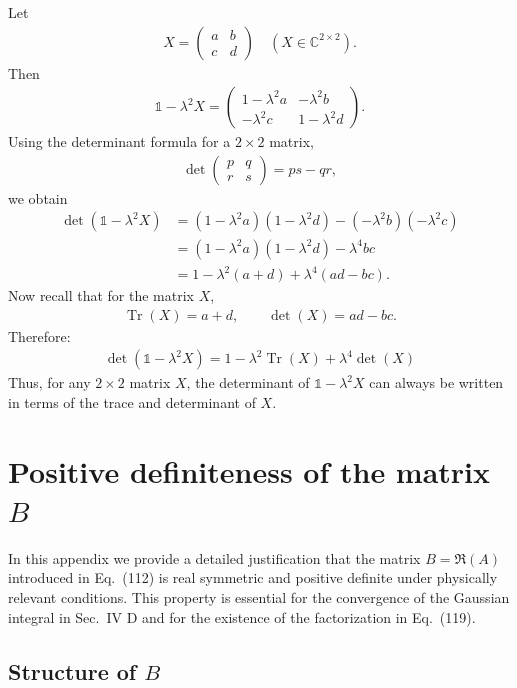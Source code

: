 \documentclass[%
 reprint,
 amsmath,amssymb,
 aps,
twocolumn
]{revtex4-2}
\DeclareMathOperator{\Tr}{Tr}
\begin{document}
Let
\begin{align}
X=
\begin{pmatrix}
a & b\\
c & d
\end{pmatrix}
\quad
(X\in\mathbb{C}^{2\times2}).
\end{align}
Then
\begin{align}
\mathbb{1}-\lambda^2X
=
\begin{pmatrix}
1-\lambda^2 a & -\lambda^2 b\\
-\lambda^2 c & 1-\lambda^2 d
\end{pmatrix}.
\end{align}
Using the determinant formula for a $2\times2$ matrix,
\begin{align}
\det
\begin{pmatrix}
p&q\\
r&s
\end{pmatrix}
=ps-qr,
\end{align}
we obtain
\begin{align}
\det(\mathbb{1}-\lambda^2X)
&=
(1-\lambda^2 a)(1-\lambda^2 d)-(-\lambda^2 b)(-\lambda^2 c)\\
&=
(1-\lambda^2 a)(1-\lambda^2 d)-\lambda^4bc\\
&=
1-\lambda^2(a+d)+\lambda^4(ad-bc).
\end{align}
Now recall that for the matrix $X$,
\begin{align}
\Tr(X)=a+d,
\qquad
\det(X)=ad-bc.
\end{align}
Therefore:
\begin{align}\label{appendix:det_1minusl2X}
\boxed{
\det(\mathbb{1}-\lambda^2X)
=
1-\lambda^2\Tr(X)+\lambda^4\det(X)
}
\end{align}
Thus, for any $2\times2$ matrix $X$, the determinant of $\mathbb{1}-\lambda^2X$ can always be written in terms of the trace and determinant of $X$.

\section{Positive definiteness of the matrix $B$}

In this appendix we provide a detailed justification that the matrix $B = \Re(A)$ introduced in Eq.~(112) is real symmetric and positive definite under physically relevant conditions. This property is essential for the convergence of the Gaussian integral in Sec.~IV D and for the existence of the factorization in Eq.~(119).

\subsection{Structure of $B$}
\end{document}
